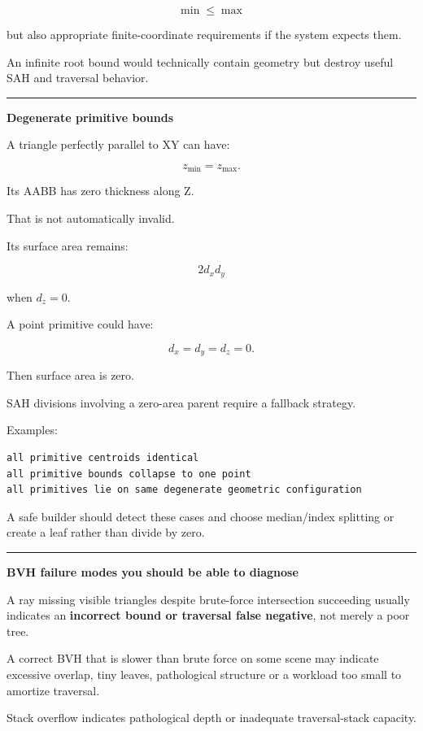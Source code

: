 \[
\min\le\max
\]

but also appropriate finite-coordinate requirements if the system expects them.

An infinite root bound would technically contain geometry but destroy useful SAH and traversal behavior.

\begin{center}\rule{0.5\linewidth}{0.5pt}\end{center}

\textbf{Degenerate primitive bounds}

A triangle perfectly parallel to XY can have:

\[
z_{\min}=z_{\max}.
\]

Its AABB has zero thickness along Z.

That is not automatically invalid.

Its surface area remains:

\[
2d_xd_y
\]

when \(d_z=0\).

A point primitive could have:

\[
d_x=d_y=d_z=0.
\]

Then surface area is zero.

SAH divisions involving a zero-area parent require a fallback strategy.

Examples:

\begin{verbatim}
all primitive centroids identical
all primitive bounds collapse to one point
all primitives lie on same degenerate geometric configuration
\end{verbatim}

A safe builder should detect these cases and choose median/index splitting or create a leaf rather than divide by zero.

\begin{center}\rule{0.5\linewidth}{0.5pt}\end{center}

\textbf{BVH failure modes you should be able to diagnose}

A ray missing visible triangles despite brute-force intersection succeeding usually indicates an \textbf{incorrect bound or traversal false negative}, not merely a poor tree.

A correct BVH that is slower than brute force on some scene may indicate excessive overlap, tiny leaves, pathological structure or a workload too small to amortize traversal.

Stack overflow indicates pathological depth or inadequate traversal-stack capacity.

